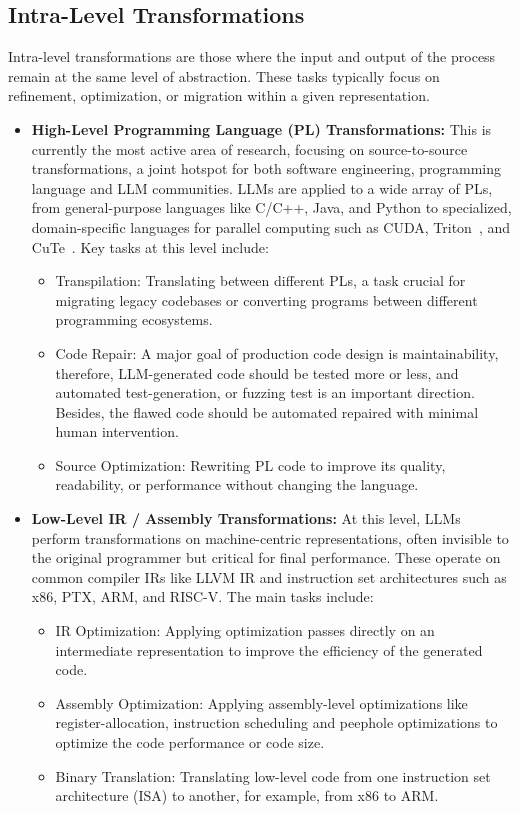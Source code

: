 \documentclass[pdflatex,sn-mathphys-ay,twocolumn, a4paper]{sn-jnl}%
\theoremstyle{thmstyleone}%
\theoremstyle{thmstyletwo}%
\theoremstyle{thmstylethree}%
\begin{document}
\subsection{Intra-Level Transformations}
Intra-level transformations are those where the input and output of the process remain at the same level of abstraction. These tasks typically focus on refinement, optimization, or migration within a given representation.
\begin{itemize}
    \item \textbf{High-Level Programming Language (PL) Transformations:} This is currently the most active area of research, focusing on source-to-source transformations, a joint hotspot for both software engineering, programming language and LLM communities. LLMs are applied to a wide array of PLs, from general-purpose languages like C/C++, Java, and Python to specialized, domain-specific languages for parallel computing such as CUDA, Triton~\citep{triton2019mapl}, and CuTe~\citep{cute2025web}. Key tasks at this level include:
    \begin{itemize}
        \item Transpilation: Translating between different PLs, a task crucial for migrating legacy codebases or converting programs between different programming ecosystems.
        \item Code Repair: A major goal of production code design is maintainability, therefore, LLM-generated code should be tested more or less, and automated test-generation, or fuzzing test is an important direction. Besides, the flawed code should be automated repaired with minimal human intervention.
        \item Source Optimization: Rewriting PL code to improve its quality, readability, or performance without changing the language.

    \end{itemize}
    \item \textbf{Low-Level IR / Assembly Transformations:} At this level, LLMs perform transformations on machine-centric representations, often invisible to the original programmer but critical for final performance. These operate on common compiler IRs like LLVM IR and instruction set architectures such as x86, PTX, ARM, and RISC-V. The main tasks include:
    \begin{itemize}
        \item IR Optimization: Applying optimization passes directly on an intermediate representation to improve the efficiency of the generated code.
        \item Assembly Optimization: Applying assembly-level optimizations like register-allocation, instruction scheduling and peephole optimizations to optimize the code performance or code size.
        \item Binary Translation: Translating low-level code from one instruction set architecture (ISA) to another, for example, from x86 to ARM. 
    \end{itemize}
\end{itemize}
\end{document}
